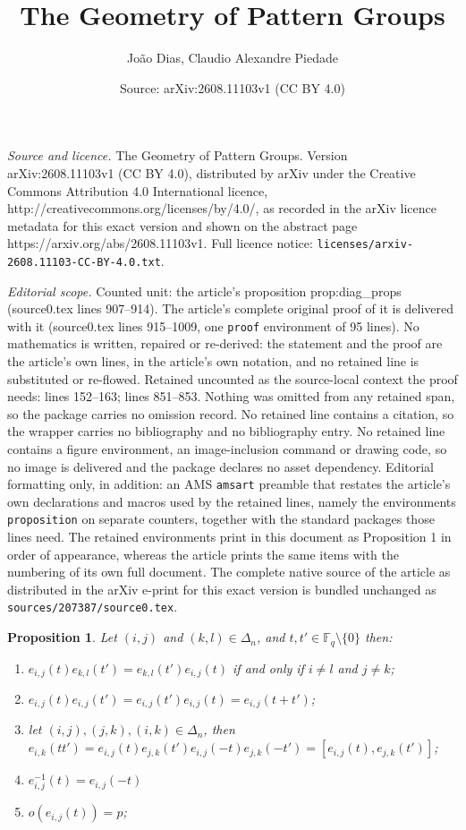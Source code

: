 \documentclass[10pt,a4paper]{amsart}
\title{The Geometry of Pattern Groups}
\author{Jo\~{a}o Dias, Claudio Alexandre Piedade}
\date{Source: arXiv:2608.11103v1 (CC BY 4.0)}
\newtheorem{proposition}{Proposition}
\newcommand{\FF}{\mathbb{F}}
\begin{document}
\maketitle

\noindent\emph{Source and licence.} The Geometry of Pattern Groups. Version arXiv:2608.11103v1 (CC BY 4.0), distributed by arXiv under the Creative Commons Attribution 4.0 International licence, http://creativecommons.org/licenses/by/4.0/, as recorded in the arXiv licence metadata for this exact version and shown on the abstract page https://arxiv.org/abs/2608.11103v1. Full licence notice: \texttt{licenses/arxiv-2608.11103-CC-BY-4.0.txt}.\par\smallskip

\noindent\textit{Editorial scope.} Counted unit: the article's proposition prop:diag\_props (source0.tex lines 907--914). The article's complete original proof of it is delivered with it (source0.tex lines 915--1009, one \texttt{proof} environment of 95 lines). No mathematics is written, repaired or re-derived: the statement and the proof are the article's own lines, in the article's own notation, and no retained line is substituted or re-flowed.  Retained uncounted as the source-local context the proof needs: lines 152--163; lines 851--853.  Nothing was omitted from any retained span, so the package carries no omission record.  No retained line contains a citation, so the wrapper carries no bibliography and no bibliography entry.  No retained line contains a figure environment, an image-inclusion command or drawing code, so no image is delivered and the package declares no asset dependency.  Editorial formatting only, in addition: an AMS \texttt{amsart} preamble that restates the article's own declarations and macros used by the retained lines, namely the environments \texttt{proposition} on separate counters, together with the standard packages those lines need.  The retained environments print in this document as Proposition 1 in order of appearance, whereas the article prints the same items with the numbering of its own full document.  The complete native source of the article as distributed in the arXiv e-print for this exact version is bundled unchanged as \texttt{sources/207387/source0.tex}.
\begin{proposition}\label{prop:gens_props}
    Let $(i,j)$ and $(k,l)\in\Delta_n$, and $t,t'\in \FF_q\setminus\{0\}$ then:
    \begin{enumerate}
        \item $e_{i,j}(t)e_{k,l}(t')=e_{k,l}(t')e_{i,j}(t)$ if and only if $i\neq l$ and $j\neq k$;
        \item $e_{i,j}(t)e_{i,j}(t')=e_{i,j}(t')e_{i,j}(t)=e_{i,j}(t+t')$;
       
        
        \item let $(i,j),(j,k),(i,k)\in \Delta_n$, then $e_{i,k}(tt')=e_{i,j}(t)e_{j,k}(t')e_{i,j}(-t)e_{j,k}(-t')=[e_{i,j}(t),e_{j,k}(t')]$;
        \item $e_{i,j}^{-1}(t) = e_{i,j}(-t)$
        \item $o(e_{i,j}(t)) = p$;
    \end{enumerate}
\end{proposition}
\end{document}
